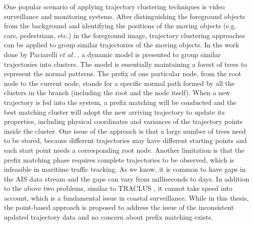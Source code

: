 \documentclass[12pt,glossary]{dalcsthesis}
\begin{document}
One popular scenario of applying trajectory clustering techniques is video surveillance and monitoring systems. After distinguishing the foreground objects from the background  \cite{videosurveillance3} and identifying
the positions of the moving objects (e.g. cars, pedestrians, etc.) in the foreground image, trajectory clustering approaches can be applied to group similar trajectories of the moving objects.  In the work done by Paciarelli $et$ $al$.  \cite{videosurveillance1}\cite{videosurveillance2}, a dynamic model is presented to group similar trajectories into clusters. The model is essentially maintaining a forest of trees to represent the normal patterns. The prefix of one particular node, from the root node to the current node, stands for a specific normal path formed by all the clusters in the branch (including the root and the node itself). When a new trajectory is fed into the system, a prefix matching will be conducted and the best matching cluster will adopt the new arriving trajectory to update its properties, including physical coordinates and variances of the trajectory points inside the cluster. One issue of the approach is that a large number of trees need to be stored, because different trajectories may have different starting points and each start point needs a corresponding root node. Another limitation is that the prefix matching phase requires complete trajectories to be observed, which is infeasible in maritime traffic tracking. As we know, it is common to have gaps in the AIS data stream and the gaps can vary from milliseconds to days. In addition to the above two problems, similar to TRACLUS \cite{Lee07}, it cannot take speed into account, which is a fundamental issue in coastal surveillance. While in this thesis, the point-based approach is proposed to address the issue of the inconsistent updated trajectory data and no concern about prefix matching exists.
\end{document}
